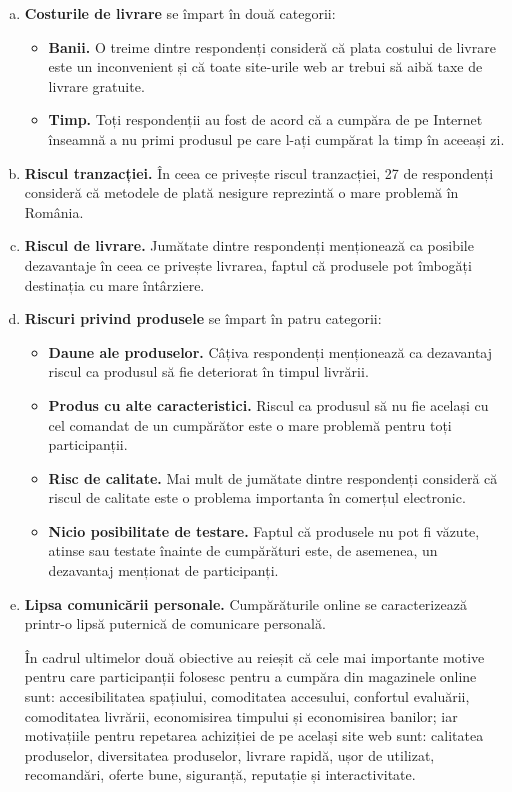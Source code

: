 \documentclass[a4paper, 12pt]{article}
\begin{document}
	\begin{enumerate}[a.]
		\item \textbf {Costurile de livrare} se împart în două categorii:
	\begin{itemize}
		\item\textbf{Banii.} O treime dintre respondenți consideră că plata costului de livrare este un inconvenient și că toate site-urile web ar trebui să aibă taxe de livrare gratuite.
		\item\textbf{Timp.} Toți respondenții au fost de acord că a cumpăra de pe Internet înseamnă a nu primi produsul pe care l-ați cumpărat la timp în aceeași zi.
	\end{itemize}
	\item\textbf{Riscul tranzacției.} În ceea ce privește riscul tranzacției, 27 de respondenți consideră că metodele de plată nesigure reprezintă o mare problemă în România.
	\item\textbf {Riscul de livrare.}
		Jumătate dintre respondenți menționează ca posibile dezavantaje în ceea ce privește livrarea, faptul că produsele pot îmbogăți destinația cu mare întârziere.
	\item\textbf{Riscuri privind produsele} se împart în patru categorii:
	\begin{itemize}
	\item \textbf{Daune ale produselor.} Câțiva respondenți menționează ca dezavantaj riscul ca produsul să fie deteriorat în timpul livrării.
	\item\textbf{Produs cu alte caracteristici.} Riscul ca produsul să nu fie același cu cel comandat de un cumpărător este o mare problemă pentru toți participanții.
	\item\textbf{Risc de calitate.} Mai mult de jumătate dintre respondenți consideră că riscul de calitate este o problema importanta în comerțul electronic.
	\item\textbf{Nicio posibilitate de testare.} Faptul că produsele nu pot fi văzute, atinse sau testate înainte de cumpărături este, de asemenea, un dezavantaj menționat de participanți.
	\end{itemize}
	\item\textbf{Lipsa comunicării personale.}
		Cumpărăturile online se caracterizează printr-o lipsă puternică de comunicare personală.
		
		\qquad În cadrul ultimelor două obiective au reieșit că cele mai importante motive pentru care participanții folosesc pentru a cumpăra din magazinele online sunt: accesibilitatea spațiului, comoditatea accesului, confortul evaluării, comoditatea livrării, economisirea timpului și economisirea banilor; iar motivațiile pentru repetarea achiziției de pe același site web sunt: calitatea produselor, diversitatea produselor, livrare rapidă, ușor de utilizat, recomandări, oferte bune, siguranță, reputație și interactivitate.
	\end{enumerate}
\end{document}
